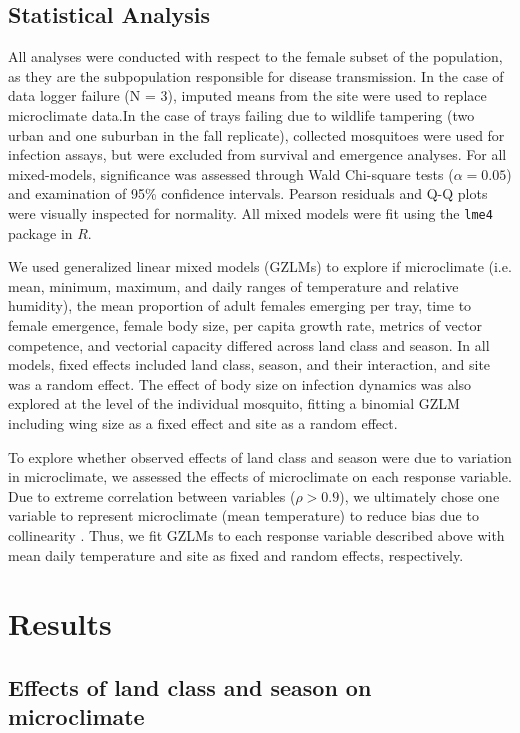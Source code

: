 \documentclass[12pt]{article}
\begin{document}
\subsection{Statistical Analysis}

All analyses were conducted with respect to the female subset of the population, as they are the subpopulation responsible for disease transmission. In the case of data logger failure (N = 3), imputed means from the site were used to replace microclimate data.In the case of trays failing due to wildlife tampering (two urban and one suburban in the fall replicate), collected mosquitoes were used for infection assays, but were excluded from survival and emergence analyses. For all mixed-models, significance was assessed through Wald Chi-square tests ($\alpha=0.05$) and examination of 95\% confidence intervals. Pearson residuals and Q-Q plots were visually inspected for normality. All mixed models were fit using the \texttt{lme4} package in $R$.

We used generalized linear mixed models (GZLMs) to explore if microclimate (i.e. mean, minimum, maximum, and daily ranges of temperature and relative humidity), the mean proportion of adult females emerging per tray, time to female emergence, female body size, per capita growth rate, metrics of vector competence, and vectorial capacity differed across land class and season. In all models, fixed effects included land class, season, and their interaction, and site was a random effect. The effect of body size on infection dynamics was also explored at the level of the individual mosquito, fitting a binomial GZLM including wing size as a fixed effect and site as a random effect.

To explore whether observed effects of land class and season were due to variation in microclimate, we assessed the effects of microclimate on each response variable. Due to extreme correlation between variables ($\rho>0.9$), we ultimately chose one variable to represent microclimate (mean temperature) to reduce bias due to collinearity \citep{graham2003}. Thus, we fit GZLMs to each response variable described above with mean daily temperature and site as fixed and random effects, respectively.

\section{Results}

\subsection{Effects of land class and season on microclimate}
\end{document}
